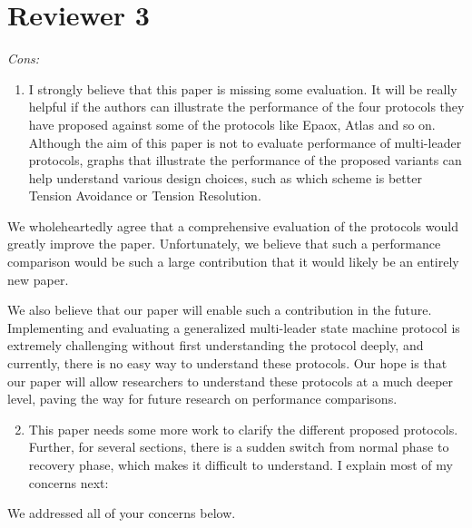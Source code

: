 \documentclass[letterpaper,twocolumn,10pt]{article}
\newenvironment{reviewerquote}
{\list{}{\leftmargin=\parindent\rightmargin=0in}\item[] \itshape \color{ReviewerDarkGray}}%
{\endlist}
\begin{document}
\section*{Reviewer 3}
\begin{reviewerquote}
  Cons:

  \begin{enumerate}
    \setcounter{enumi}{0}
    \item
      I strongly believe that this paper is missing some evaluation. It will be
      really helpful if the authors can illustrate the performance of the four
      protocols they have proposed against some of the protocols like Epaox,
      Atlas and so on. Although the aim of this paper is not to evaluate
      performance of multi-leader protocols, graphs that illustrate the
      performance of the proposed variants can help understand various design
      choices, such as which scheme is better Tension Avoidance or Tension
      Resolution.
  \end{enumerate}
\end{reviewerquote}

We wholeheartedly agree that a comprehensive evaluation of the protocols would
greatly improve the paper. Unfortunately, we believe that such a performance
comparison would be such a large contribution that it would likely be an
entirely new paper.

We also believe that our paper will enable such a contribution in the future.
Implementing and evaluating a generalized multi-leader state machine protocol
is extremely challenging without first understanding the protocol deeply, and
currently, there is no easy way to understand these protocols. Our hope is that
our paper will allow researchers to understand these protocols at a much deeper
level, paving the way for future research on performance comparisons.

\begin{reviewerquote}
  \begin{enumerate}
    \setcounter{enumi}{1}
    \item
      This paper needs some more work to clarify the different proposed
      protocols. Further, for several sections, there is a sudden switch from
      normal phase to recovery phase, which makes it difficult to understand. I
      explain most of my concerns next:
  \end{enumerate}
\end{reviewerquote}

We addressed all of your concerns below.
\end{document}
